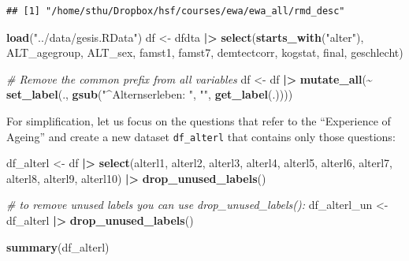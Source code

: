 \documentclass[
  doc]{apa6}
\newenvironment{Shaded}{\begin{snugshade}}{\end{snugshade}}
\newcommand{\CommentTok}[1]{\textcolor[rgb]{0.56,0.35,0.01}{\textit{#1}}}
\newcommand{\FunctionTok}[1]{\textcolor[rgb]{0.13,0.29,0.53}{\textbf{#1}}}
\newcommand{\NormalTok}[1]{#1}
\newcommand{\OtherTok}[1]{\textcolor[rgb]{0.56,0.35,0.01}{#1}}
\newcommand{\SpecialCharTok}[1]{\textcolor[rgb]{0.81,0.36,0.00}{\textbf{#1}}}
\newcommand{\StringTok}[1]{\textcolor[rgb]{0.31,0.60,0.02}{#1}}
\begin{document}
\begin{verbatim}
## [1] "/home/sthu/Dropbox/hsf/courses/ewa/ewa_all/rmd_desc"
\end{verbatim}

\begin{Shaded}
\begin{Highlighting}[]
\FunctionTok{load}\NormalTok{(}\StringTok{"../data/gesis.RData"}\NormalTok{)}
\NormalTok{df }\OtherTok{\textless{}{-}}\NormalTok{ dfdta }\SpecialCharTok{|\textgreater{}}
  \FunctionTok{select}\NormalTok{(}\FunctionTok{starts\_with}\NormalTok{(}\StringTok{"alter"}\NormalTok{), }
\NormalTok{         ALT\_agegroup, }
\NormalTok{         ALT\_sex, }
\NormalTok{         famst1, famst7, }
\NormalTok{         demtectcorr, }
\NormalTok{         kogstat, }
\NormalTok{         final, }
\NormalTok{         geschlecht)}

\CommentTok{\# Remove the common prefix from all variables}
\NormalTok{df }\OtherTok{\textless{}{-}}\NormalTok{ df }\SpecialCharTok{|\textgreater{}} 
  \FunctionTok{mutate\_all}\NormalTok{(}\SpecialCharTok{\textasciitilde{}} \FunctionTok{set\_label}\NormalTok{(., }\FunctionTok{gsub}\NormalTok{(}\StringTok{"\^{}Alternserleben: "}\NormalTok{, }\StringTok{""}\NormalTok{, }\FunctionTok{get\_label}\NormalTok{(.))))}
\end{Highlighting}
\end{Shaded}

For simplification, let us focus on the questions that refer to the ``Experience of Ageing'' and create a new dataset \texttt{df\_alterl} that contains only those questions:

\begin{Shaded}
\begin{Highlighting}[]
\NormalTok{df\_alterl }\OtherTok{\textless{}{-}}\NormalTok{ df }\SpecialCharTok{|\textgreater{}} 
  \FunctionTok{select}\NormalTok{(alterl1, }
\NormalTok{         alterl2, }
\NormalTok{         alterl3, }
\NormalTok{         alterl4, }
\NormalTok{         alterl5, }
\NormalTok{         alterl6, }
\NormalTok{         alterl7, }
\NormalTok{         alterl8, }
\NormalTok{         alterl9, }
\NormalTok{         alterl10) }\SpecialCharTok{|\textgreater{}} 
  \FunctionTok{drop\_unused\_labels}\NormalTok{() }

\CommentTok{\# to remove unused labels you can use drop\_unused\_labels():}
\NormalTok{df\_alterl\_un }\OtherTok{\textless{}{-}}\NormalTok{ df\_alterl }\SpecialCharTok{|\textgreater{}}
  \FunctionTok{drop\_unused\_labels}\NormalTok{()}

\FunctionTok{summary}\NormalTok{(df\_alterl)}
\end{Highlighting}
\end{Shaded}
\end{document}
